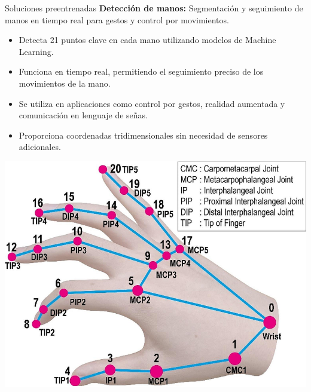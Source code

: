 \begin{frame}{Soluciones preentrenadas}
   \textbf{Detección de manos:} Segmentación y seguimiento de manos en tiempo real para gestos y control por movimientos.
   \begin{itemize}
        \item Detecta 21 puntos clave en cada mano utilizando modelos de Machine Learning.
        \item Funciona en tiempo real, permitiendo el seguimiento preciso de los movimientos de la mano.
        \item Se utiliza en aplicaciones como control por gestos, realidad aumentada y comunicación en lenguaje de señas.
        \item Proporciona coordenadas tridimensionales sin necesidad de sensores adicionales.
    \end{itemize}
    \begin{center}
        \includegraphics[width=0.6\linewidth]{01_MediaPipe/hand_landmarks.png}
    \end{center}
\end{frame}


